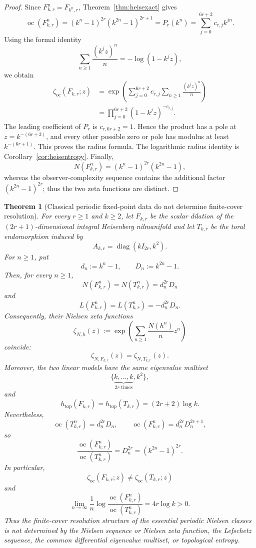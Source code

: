 \documentclass[11pt]{article}
\newtheorem{theorem}{Theorem}[section]
\DeclareMathOperator{\oc}{oc}
\newcommand{\zetaoc}{\zeta_{\mathrm{oc}}}
\begin{document}
\begin{proof}
Since $F_{k,r}^n=F_{k^n,r}$, Theorem~\ref{thm:heisexact} gives
\[
  \oc(F_{k,r}^n)
  =(k^n-1)^{2r}(k^{2n}-1)^{2r+1}
  =P_r(k^n)
  =\sum_{j=0}^{6r+2}c_{r,j}k^{jn}.
\]
Using the formal identity
\[
  \sum_{n\ge1}\frac{(k^jz)^n}{n}=-\log(1-k^jz),
\]
we obtain
\[
\begin{aligned}
  \zetaoc(F_{k,r};z)
  &=\exp\left(
      \sum_{j=0}^{6r+2}c_{r,j}
      \sum_{n\ge1}\frac{(k^jz)^n}{n}
    \right)\\
  &=\prod_{j=0}^{6r+2}(1-k^jz)^{-c_{r,j}}.
\end{aligned}
\]
The leading coefficient of $P_r$ is $c_{r,6r+2}=1$.  Hence the product has a
pole at $z=k^{-(6r+2)}$, and every other possible zero or pole has modulus at
least $k^{-(6r+1)}$.  This proves the radius formula.  The logarithmic radius
identity is Corollary~\ref{cor:heisentropy}.  Finally,
\[
  N(F_{k,r}^n)=(k^n-1)^{2r}(k^{2n}-1),
\]
whereas the observer-complexity sequence contains the additional factor
$(k^{2n}-1)^{2r}$; thus the two zeta functions are distinct.
\end{proof}

\begin{theorem}[Classical periodic fixed-point data do not determine finite-cover resolution]
\label{thm:nondetermination}
For every $r\ge1$ and $k\ge2$, let $F_{k,r}$ be the scalar dilation of the
$(2r+1)$-dimensional integral Heisenberg nilmanifold and let $T_{k,r}$ be the
toral endomorphism induced by
\[
  A_{k,r}=\operatorname{diag}(kI_{2r},k^2).
\]
For $n\ge1$, put
\[
  d_n:=k^n-1,
  \qquad
  D_n:=k^{2n}-1.
\]
Then, for every $n\ge1$,
\[
  N(F_{k,r}^n)=N(T_{k,r}^n)=d_n^{2r}D_n
\]
and
\[
  L(F_{k,r}^n)=L(T_{k,r}^n)=-d_n^{2r}D_n.
\]
Consequently, their Nielsen zeta functions
\[
  \zeta_{N,h}(z)
  :=\exp\left(\sum_{n\ge1}\frac{N(h^n)}{n}z^n\right)
\]
coincide:
\[
  \zeta_{N,F_{k,r}}(z)=\zeta_{N,T_{k,r}}(z).
\]
Moreover, the two linear models have the same eigenvalue multiset
\[
  \{\underbrace{k,\ldots,k}_{2r\text{ times}},k^2\},
\]
and
\[
  h_{\mathrm{top}}(F_{k,r})
  =h_{\mathrm{top}}(T_{k,r})
  =(2r+2)\log k.
\]
Nevertheless,
\[
  \oc(T_{k,r}^n)=d_n^{2r}D_n,
  \qquad
  \oc(F_{k,r}^n)=d_n^{2r}D_n^{2r+1},
\]
so
\[
  \boxed{
  \frac{\oc(F_{k,r}^n)}{\oc(T_{k,r}^n)}
  =D_n^{2r}
  =(k^{2n}-1)^{2r}.}
\]
In particular,
\[
  \zetaoc(F_{k,r};z)\ne\zetaoc(T_{k,r};z)
\]
and
\[
  \boxed{
  \lim_{n\to\infty}\frac1n
  \log\frac{\oc(F_{k,r}^n)}{\oc(T_{k,r}^n)}
  =4r\log k>0.}
\]
Thus the finite-cover resolution structure of the essential periodic
Nielsen classes is not determined by the Nielsen sequence or Nielsen zeta
function, the Lefschetz sequence, the common differential eigenvalue multiset, or
topological entropy.
\end{theorem}
\end{document}
